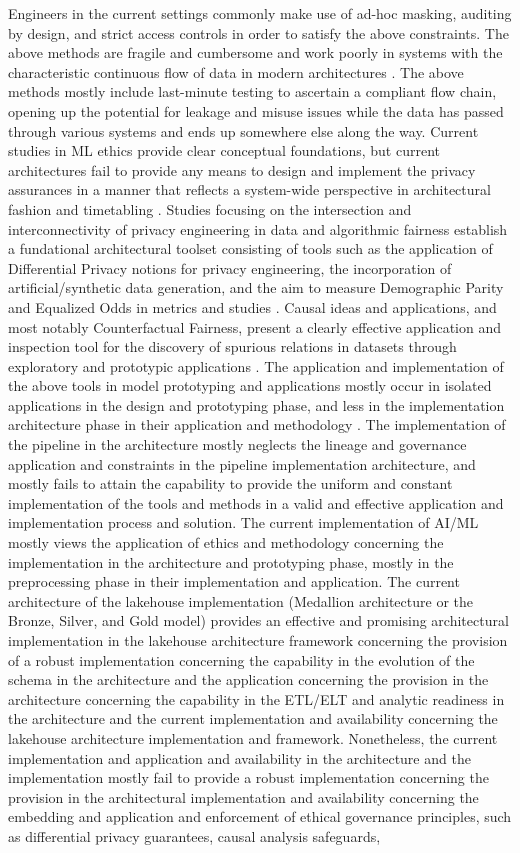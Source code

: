 Engineers in the current settings commonly make use of ad-hoc masking, auditing by design, and strict access controls in order to satisfy the above constraints. The above methods are fragile and cumbersome and work poorly in systems with the characteristic continuous flow of data in modern architectures . The above methods mostly include last-minute testing to ascertain a compliant flow chain, opening up the potential for leakage and misuse issues while the data has passed through various systems and ends up somewhere else along the way. Current studies in ML ethics provide clear conceptual foundations, but current architectures fail to provide any means to design and implement the privacy assurances in a manner that reflects a system-wide perspective in architectural fashion and timetabling .  Studies focusing on the intersection and interconnectivity of privacy engineering in data and algorithmic fairness establish a fundational architectural toolset consisting of tools such as the application of Differential Privacy notions for privacy engineering, the incorporation of artificial/synthetic data generation, and the aim to measure Demographic Parity and Equalized Odds in metrics and studies . Causal ideas and applications, and most notably Counterfactual Fairness, present a clearly effective application and inspection tool for the discovery of spurious relations in datasets through exploratory and prototypic applications . The application and implementation of the above tools in model prototyping and applications mostly occur in isolated applications in the design and prototyping phase, and less in the implementation architecture phase in their application and methodology . The implementation of the pipeline in the architecture mostly neglects the lineage and governance application and constraints in the pipeline implementation architecture, and mostly fails to attain the capability to provide the uniform and constant implementation of the tools and methods in a valid and effective application and implementation process and solution. The current implementation of AI/ML mostly views the application of ethics and methodology concerning the implementation in the architecture and prototyping phase, mostly in the preprocessing phase in their implementation and application. The current architecture of the lakehouse implementation (Medallion architecture or the Bronze, Silver, and Gold model)  provides an effective and promising architectural implementation in the lakehouse architecture framework concerning the provision of a robust implementation concerning the capability in the evolution of the schema in the architecture and the application concerning the provision in the architecture concerning the capability in the ETL/ELT and analytic readiness in the architecture and the current implementation and availability concerning the lakehouse architecture implementation and framework. Nonetheless, the current implementation and application and availability in the architecture and the implementation mostly fail to provide a robust implementation concerning the provision in the architectural implementation and availability concerning the embedding and application and enforcement of ethical governance principles, such as differential privacy guarantees, causal analysis safeguards, 